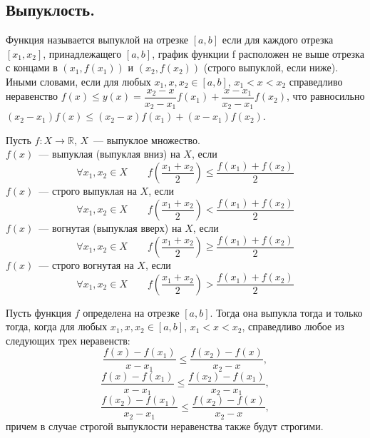 \documentclass[12pt]{article}
\begin{document}
	\subsection{Выпуклость.}
	\begin{definition}
		Функция называется выпуклой на отрезке $[a, b]$ если для каждого отрезка $[x_1, x_2]$, принадлежащего $[a, b]$, график функции f расположен не выше отрезка с концами в $(x_1, f(x_1))$ и $(x_2, f(x_2))$ (строго выпуклой, если ниже). Иными словами, если для любых $x_1, x, x_2 \in [a, b]$, $x_1 < x < x_2$ справедливо неравенство $f(x) \leqslant y(x) = \dfrac{x_2 - x}{x_2 - x_1} f(x_1) + \dfrac{x - x_1}{x_2 - x_1} f(x_2)$, что равносильно $(x_2 - x_1) f(x) \leqslant (x_2 - x) f(x_1) + (x - x_1) f(x_2)$.
	\end{definition}
	\begin{definition}
		Пусть $f: X \rightarrow \mathbb{R}$, $X$~--- выпуклое множество.\\
		$f(x)$~--- выпуклая (выпуклая вниз) на $X$, если
		$$
		\forall x_1, x_2 \in X \qquad f \left( \dfrac{x_1 + x_2}{2} \right) \leqslant \dfrac{f(x_1) + f(x_2)}{2}
		$$
		$f(x)$~--- строго выпуклая на $X$, если
		$$
		\forall x_1, x_2 \in X \qquad f \left( \dfrac{x_1 + x_2}{2} \right) < \dfrac{f(x_1) + f(x_2)}{2}
		$$
		$f(x)$~--- вогнутая (выпуклая вверх) на $X$, если
		$$
		\forall x_1, x_2 \in X \qquad f \left( \dfrac{x_1 + x_2}{2} \right) \geqslant \dfrac{f(x_1) + f(x_2)}{2}
		$$
		$f(x)$~--- строго вогнутая на $X$, если
		$$
		\forall x_1, x_2 \in X \qquad f \left( \dfrac{x_1 + x_2}{2} \right) > \dfrac{f(x_1) + f(x_2)}{2}
		$$
	\end{definition}
	\begin{lemma}
		Пусть функция $f$ определена на отрезке $[a, b]$. Тогда она выпукла тогда и только тогда, когда для любых $x_1, x, x_2 \in [a, b]$, $x_1 < x < x_2$, справедливо любое из следующих трех неравенств:
		$$
		\frac{f(x) - f(x_1)}{x - x_1} \leqslant \frac{f(x_2) - f(x)}{x_2 - x},
		$$
		$$
		\frac{f(x) - f(x_1)}{x - x_1} \leqslant \frac{f(x_2) - f(x_1)}{x_2 - x_1},
		$$
		$$
		\frac{f(x_2) - f(x_1)}{x_2 - x_1} \leqslant \frac{f(x_2) - f(x)}{x_2 - x},
		$$
		причем в случае строгой выпуклости неравенства также будут строгими.
	\end{lemma}
\end{document}
